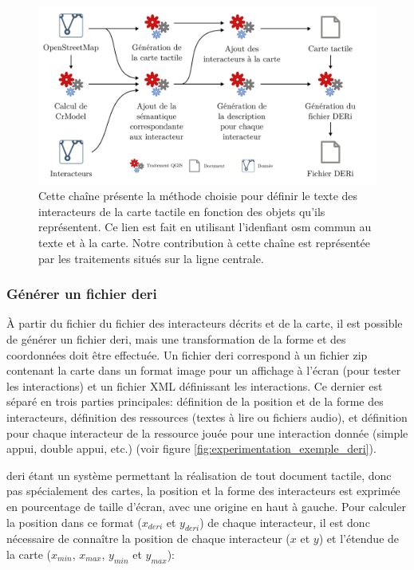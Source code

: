\begin{figure}[ht]
    \centering
    \includegraphics[width=\textwidth]{images/experimentation/pipeline_creation_deri1.pdf}
    \caption[Chaîne de traitement SIG pour générer un DERi]{Cette chaîne présente la méthode choisie pour définir le texte des interacteurs de la carte tactile en fonction des objets qu'ils représentent. Ce lien est fait en utilisant l'idenfiant \gls{osm} commun au texte et à la carte. Notre contribution à cette chaîne est représentée par les traitements situés sur la ligne centrale.}
    \label{fig:experimentation_lien_carte_texte}
\end{figure}

\subsubsection{Générer un fichier \gls{deri}}

\label{sec:experimentation_generer_deri}

À partir du fichier du fichier des interacteurs décrits et de la carte, il est possible de générer un fichier \gls{deri}, mais une transformation de la forme et des coordonnées doit être effectuée. Un fichier \gls{deri} correspond à un fichier zip contenant la carte dans un format image pour un affichage à l'écran (pour tester les interactions) et un fichier XML définissant les interactions. Ce dernier est séparé en trois parties principales: définition de la position et de la forme des interacteurs, définition des ressources (textes à lire ou fichiers audio), et définition pour chaque interacteur de la ressource jouée pour une interaction donnée (simple appui, double appui, etc.) (voir figure \ref{fig:experimentation_exemple_deri}). 

\newpar{}

\gls{deri} étant un système permettant la réalisation de tout document tactile, donc pas spécialement des cartes, la position et la forme des interacteurs est exprimée en pourcentage de taille d'écran, avec une origine en haut à gauche. Pour calculer la position dans ce format ($x_{deri}$ et $y_{deri}$) de chaque interacteur, il est donc nécessaire de connaître la position de chaque interacteur ($x$ et $y$) et l'étendue de la carte ($x_{min}$, $x_{max}$, $y_{min}$ et $y_{max}$):

